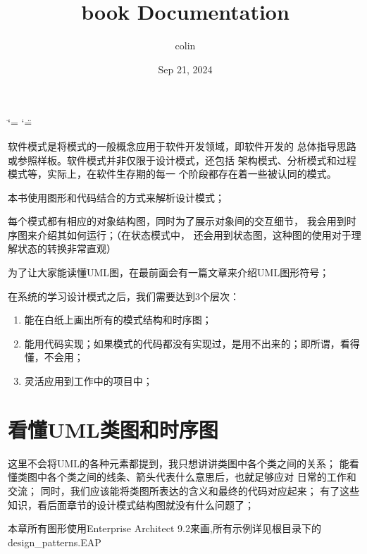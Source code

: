 \documentclass[letterpaper,10pt,english]{sphinxmanual}
\title{book Documentation}
\date{Sep 21, 2024}
\author{colin}
\begin{document}
\ifdefined\shorthandoff
  \ifnum\catcode`\=\string=\active\shorthandoff{=}\fi
  \ifnum\catcode`\"=\active{}\fi
\fi

\pagestyle{empty}
\sphinxmaketitle
\pagestyle{plain}
\sphinxtableofcontents
\pagestyle{normal}
\label{\detokenize{index::doc}}


\sphinxAtStartPar
软件模式是将模式的一般概念应用于软件开发领域，即软件开发的
总体指导思路或参照样板。软件模式并非仅限于设计模式，还包括
架构模式、分析模式和过程模式等，实际上，在软件生存期的每一
个阶段都存在着一些被认同的模式。

\sphinxAtStartPar
本书使用图形和代码结合的方式来解析设计模式；

\sphinxAtStartPar
每个模式都有相应的对象结构图，同时为了展示对象间的交互细节， 我会用到时序图来介绍其如何运行；（在状态模式中， 还会用到状态图，这种图的使用对于理解状态的转换非常直观）

\sphinxAtStartPar
为了让大家能读懂UML图，在最前面会有一篇文章来介绍UML图形符号；

\sphinxAtStartPar
在系统的学习设计模式之后，我们需要达到3个层次：
\begin{enumerate}
%
\item {} 
\sphinxAtStartPar
能在白纸上画出所有的模式结构和时序图；

\item {} 
\sphinxAtStartPar
能用代码实现；如果模式的代码都没有实现过，是用不出来的；即所谓，看得懂，不会用；

\item {} 
\sphinxAtStartPar
灵活应用到工作中的项目中；

\end{enumerate}

\sphinxstepscope


\chapter{看懂UML类图和时序图}
\label{\detokenize{read_uml:uml}}\label{\detokenize{read_uml:read-uml}}\label{\detokenize{read_uml::doc}}
\sphinxAtStartPar
这里不会将UML的各种元素都提到，我只想讲讲类图中各个类之间的关系；
能看懂类图中各个类之间的线条、箭头代表什么意思后，也就足够应对
日常的工作和交流；
同时，我们应该能将类图所表达的含义和最终的代码对应起来；
有了这些知识，看后面章节的设计模式结构图就没有什么问题了；

\sphinxAtStartPar
本章所有图形使用Enterprise Architect 9.2来画,所有示例详见根目录下的design\_patterns.EAP
\end{document}
